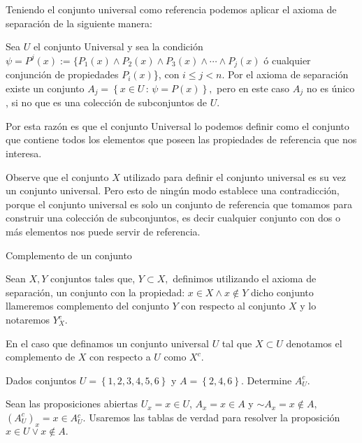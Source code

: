 Teniendo el conjunto universal como referencia podemos aplicar el
axioma de separación de la siguiente manera:

Sea $U$ el conjunto Universal y sea la condición $\psi=P^{j}\left(x\right):=\{P_{1}\left(x\right)\wedge P_{2}\left(x\right)\wedge P_{3}\left(x\right)\wedge\cdots\wedge P_{j}\left(x\right)$
ó cualquier conjunción de propiedades $P_{i}(x)$\}, con $i\leq j<n$.
Por el axioma de separación existe un conjunto $A_{j}=\left\{ x\in U\,:\,\psi=P\left(x\right)\right\} ,$
pero en este caso $A_{j}$ no es único , si no que es una colección
de subconjuntos de $U.$

Por esta razón es que el conjunto Universal lo podemos definir como
el conjunto que contiene todos los elementos que poseen las propiedades
de referencia que nos interesa.

\obs Observe que el conjunto $X$ utilizado para definir el conjunto
universal es su vez un conjunto universal. Pero esto de ningún modo
establece una contradicción, porque el conjunto universal es solo
un conjunto de referencia que tomamos para construir una colección
de subconjuntos, es decir cualquier conjunto con dos o más elementos
nos puede servir de referencia.

\begin{defi}{Complemento de un conjunto}{}

Sean $X,Y$ conjuntos tales que, $Y\subset X,$ definimos utilizando
el axioma de separación, un conjunto con la propiedad: $x\in X\wedge x\notin Y$
dicho conjunto llameremos complemento del conjunto $Y$ con respecto
al conjunto $X$ y lo notaremos $Y_{X}^{c}$.

\end{defi}

\obs En el caso que definamos un conjunto universal $U$ tal que
$X\subset U$ denotamos el complemento de $X$ con respecto a $U$
como $X^{c}$.

\begin{ejemplo}

Dados conjuntos $U=\left\{ 1,2,3,4,5,6\right\} $ y $A=\left\{ 2,4,6\right\} .$
Determine $A_{U}^{c}.$ 

\end{ejemplo}

\solu Sean las proposiciones abiertas $U_{x}=x\in U$, $A_{x}=x\in A$
y $\sim A_{x}=x\notin A,$ $\left(A_{U}^{c}\right)_{x}=x\in$$A$$_{U}^{c}.$
Usaremos las tablas de verdad para resolver la proposición $x\in U\vee x\notin A.$

